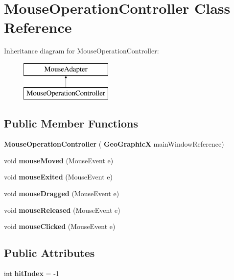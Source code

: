 \section{Mouse\+Operation\+Controller Class Reference}
\label{class_mouse_operation_controller}
Inheritance diagram for Mouse\+Operation\+Controller\+:\begin{figure}[H]
\begin{center}
\leavevmode
\includegraphics[height=2.000000cm]{class_mouse_operation_controller}
\end{center}
\end{figure}
\subsection*{Public Member Functions}
\begin{DoxyCompactItemize}
\item 
\textbf{ Mouse\+Operation\+Controller} (\textbf{ Geo\+GraphicX} main\+Window\+Reference)
\item 
\mbox{\label{class_mouse_operation_controller_abd98fc9952b8cade251559655074e18f}} 
void {\bfseries mouse\+Moved} (Mouse\+Event e)
\item 
\mbox{\label{class_mouse_operation_controller_ae75e28891a828d5572a66d432d5614af}} 
void {\bfseries mouse\+Exited} (Mouse\+Event e)
\item 
\mbox{\label{class_mouse_operation_controller_aa899611e53870726b21b860eade6a209}} 
void {\bfseries mouse\+Dragged} (Mouse\+Event e)
\item 
\mbox{\label{class_mouse_operation_controller_acf59899ca44f8be7483af10919668b1f}} 
void {\bfseries mouse\+Released} (Mouse\+Event e)
\item 
\mbox{\label{class_mouse_operation_controller_ab87e47fbe4711dd9ea2abb300ae24af0}} 
void {\bfseries mouse\+Clicked} (Mouse\+Event e)
\end{DoxyCompactItemize}
\subsection*{Public Attributes}
\begin{DoxyCompactItemize}
\item 
int \textbf{ hit\+Index} = -\/1
\end{DoxyCompactItemize}


